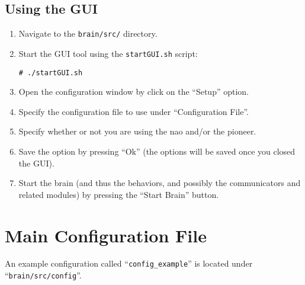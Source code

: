\documentclass[a4paper, 10pt]{article}
\begin{document}
\subsection{Using the GUI}

\begin{enumerate}
    \item Navigate to the \lstinline{brain/src/} directory.
    \item Start the GUI tool using the \lstinline{startGUI.sh} script:
\begin{lstlisting}
# ./startGUI.sh
\end{lstlisting}
    \item Open the configuration window by click on the ``Setup'' option.
    \item Specify the configuration file to use under ``Configuration File''.
    \item Specify whether or not you are using the nao and/or the pioneer.
    \item Save the option by pressing ``Ok'' (the options will be saved once you closed the GUI).
    \item Start the brain (and thus the behaviors, and possibly the communicators and related modules) by pressing the ``Start Brain'' button.
\end{enumerate}




\section{Main Configuration File}
\label{sec:config}

An example configuration called ``\lstinline{config_example}'' is located under ``\lstinline{brain/src/config}''.
\end{document}

